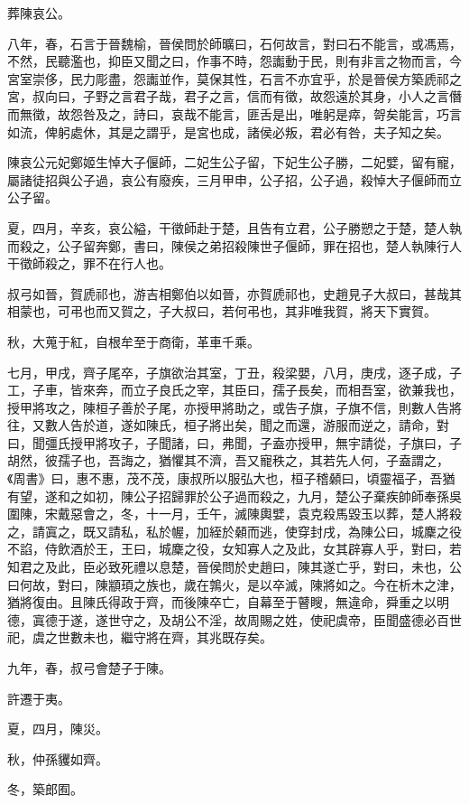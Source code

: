 \begin{pinyinscope}
葬陳哀公。

八年，春，石言于晉魏榆，晉侯問於師曠曰，石何故言，對曰石不能言，或馮焉，不然，民聽濫也，抑臣又聞之曰，作事不時，怨讟動于民，則有非言之物而言，今宮室崇侈，民力彫盡，怨讟並作，莫保其性，石言不亦宜乎，於是晉侯方築虒祁之宮，叔向曰，子野之言君子哉，君子之言，信而有徵，故怨遠於其身，小人之言僭而無徵，故怨咎及之，詩曰，哀哉不能言，匪舌是出，唯躬是瘁，哿矣能言，巧言如流，俾躬處休，其是之謂乎，是宮也成，諸侯必叛，君必有咎，夫子知之矣。

陳哀公元妃鄭姬生悼大子偃師，二妃生公子留，下妃生公子勝，二妃嬖，留有寵，屬諸徒招與公子過，哀公有廢疾，三月甲申，公子招，公子過，殺悼大子偃師而立公子留。

夏，四月，辛亥，哀公縊，干徵師赴于楚，且告有立君，公子勝愬之于楚，楚人執而殺之，公子留奔鄭，書曰，陳侯之弟招殺陳世子偃師，罪在招也，楚人執陳行人干徵師殺之，罪不在行人也。

叔弓如晉，賀虒祁也，游吉相鄭伯以如晉，亦賀虒祁也，史趙見子大叔曰，甚哉其相蒙也，可弔也而又賀之，子大叔曰，若何弔也，其非唯我賀，將天下實賀。

秋，大蒐于紅，自根牟至于商衛，革車千乘。

七月，甲戌，齊子尾卒，子旗欲治其室，丁丑，殺梁嬰，八月，庚戌，逐子成，子工，子車，皆來奔，而立子良氏之宰，其臣曰，孺子長矣，而相吾室，欲兼我也，授甲將攻之，陳桓子善於子尾，亦授甲將助之，或告子旗，子旗不信，則數人告將往，又數人告於道，遂如陳氏，桓子將出矣，聞之而還，游服而逆之，請命，對曰，聞彊氏授甲將攻子，子聞諸，曰，弗聞，子盍亦授甲，無宇請從，子旗曰，子胡然，彼孺子也，吾誨之，猶懼其不濟，吾又寵秩之，其若先人何，子盍謂之，《周書》曰，惠不惠，茂不茂，康叔所以服弘大也，桓子稽顙曰，頃靈福子，吾猶有望，遂和之如初，陳公子招歸罪於公子過而殺之，九月，楚公子棄疾帥師奉孫吳圍陳，宋戴惡會之，冬，十一月，壬午，滅陳輿嬖，袁克殺馬毀玉以葬，楚人將殺之，請寘之，既又請私，私於幄，加絰於顙而逃，使穿封戌，為陳公曰，城麇之役不諂，侍飲酒於王，王曰，城麇之役，女知寡人之及此，女其辟寡人乎，對曰，若知君之及此，臣必致死禮以息楚，晉侯問於史趙曰，陳其遂亡乎，對曰，未也，公曰何故，對曰，陳顓頊之族也，歲在鶉火，是以卒滅，陳將如之。今在析木之津，猶將復由。且陳氏得政于齊，而後陳卒亡，自幕至于瞽瞍，無違命，舜重之以明德，寘德于遂，遂世守之，及胡公不淫，故周賜之姓，使祀虞帝，臣聞盛德必百世祀，虞之世數未也，繼守將在齊，其兆既存矣。

九年，春，叔弓會楚子于陳。

許遷于夷。

夏，四月，陳災。

秋，仲孫貜如齊。

冬，築郎囿。


\end{pinyinscope}
